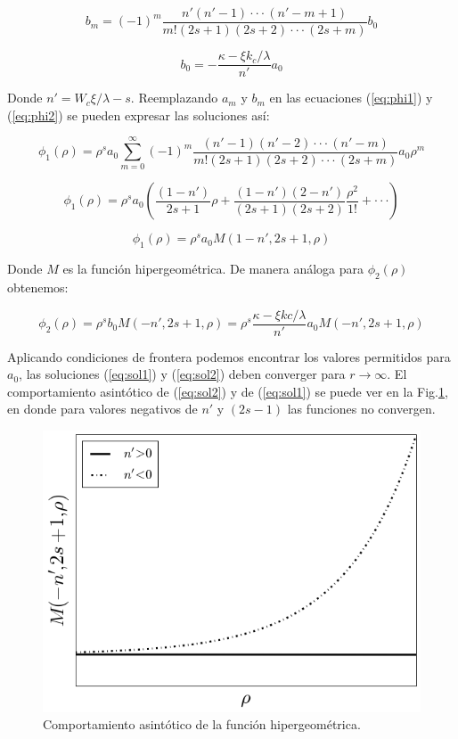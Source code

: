 \documentclass[a4paper, 12pt]{article} %
\begin{document}
\begin{equation}
b_m = (-1)^m \dfrac{n'(n'-1)\cdot\cdot\cdot(n'-m+1)}{m!(2s+1)(2s+2)\cdot\cdot\cdot(2s+m)}b_0
\end{equation}

\begin{equation}
b_0 = -\dfrac{\kappa - \xi k_c /\lambda}{n'}a_0
\end{equation}

Donde $n' = W_c\xi/\lambda - s$. Reemplazando $a_m$ y $b_m$ en las ecuaciones (\ref{eq:phi1}) y (\ref{eq:phi2})
se pueden expresar las soluciones as\'i:

\[
\phi_1(\rho) = \rho^s a_0 \sum  \limits_{m=0}^{\infty} (-1)^m \dfrac{(n'-1)(n'-2)\cdot\cdot\cdot(n'-m)}{m!(2s+1)(2s+2)\cdot\cdot\cdot(2s+m)}a_0 \rho^m 
\]

\[
\phi_1(\rho) = \rho^s a_0 \left( \dfrac{(1-n')}{2s+1} \rho + \dfrac{(1-n')(2-n')}{(2s+1)(2s+2)}\dfrac{\rho^2}{1!} + \cdot\cdot\cdot  \right)
\]

\begin{equation}\label{eq:sol1}
\phi_1(\rho) = 	\rho^s a_0 M(1-n',2s+1,\rho)
\end{equation}

Donde $M$ es la funci\'on hipergeom\'etrica. De manera an\'aloga para $\phi_2(\rho)$ obtenemos:

\begin{equation}\label{eq:sol2}
\phi_2(\rho) = \rho^s b_0 M(-n',2s+1,\rho) = \rho^s \dfrac{\kappa - \xi kc / \lambda}{n'} a_0 M(-n',2s+1,\rho)
\end{equation}

Aplicando condiciones de frontera podemos encontrar los valores permitidos para $a_0$, las soluciones
(\ref{eq:sol1}) y (\ref{eq:sol2}) deben converger para $r \rightarrow \infty$. El comportamiento 
asint\'otico de (\ref{eq:sol2}) y de (\ref{eq:sol1}) se puede ver en la Fig.\ref{fig:hypgeo}, 
en donde para valores negativos de $n'$ y $(2s-1)$ las funciones no convergen.

\begin{figure}[H]
\centering
\includegraphics[scale=0.4]{hypgeo.png}
\caption*{Comportamiento asint\'otico de la funci\'on hipergeom\'etrica.}
\label{fig:hypgeo}
\end{figure}  
\end{document}
